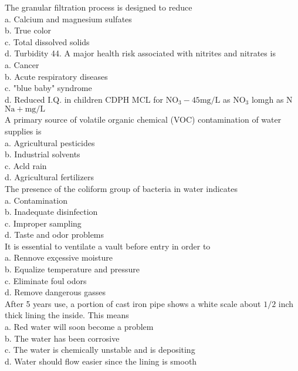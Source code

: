 The granular filtration process is designed to reduce\\
a. Calcium and magnesium sulfates\\
b. True color\\
c. Total dissolved solids\\
d. Turbidity 44. A major health risk associated with nitrites and nitrates is\\
a. Cancer\\
b. Acute respiratory diseases\\
c.  "blue baby" syndrome\\
d. Reduced I.Q. in children CDPH MCL for $\mathrm{NO}_{3}-45 \mathrm{mg} / \mathrm{L}$ as $\mathrm{NO}_{3}$ lomgh as $\mathrm{N}$\\
$\mathrm{Na}+\mathrm{mg} / \mathrm{L}$\\

A primary source of volatile organic chemical (VOC) contamination of water supplies is\\
a. Agricultural pesticides\\
b.  Industrial solvents\\
c. Acld rain\\
d. Agricultural fertilizers\\

The presence of the coliform group of bacteria in water indicates\\
a. Contamination\\
b. Inadequate disinfection\\
c. Improper sampling\\
d. Taste and odor problems\\

It is essential to ventilate a vault before entry in order to\\
a. Rennove exçessive moisture\\
b. Equalize temperature and pressure\\
c. Eliminate foul odors\\
d. Remove dangerous gasses\\

After 5 years use, a portion of cast iron pipe shows a white scale about $1 / 2$ inch thick lining the inside. This means\\
a. Red water will soon become a problem\\
b. The water has been corrosive\\
c. The water is chemically unstable and is depositing\\
d. Water should flow easier since the lining is smooth\\

